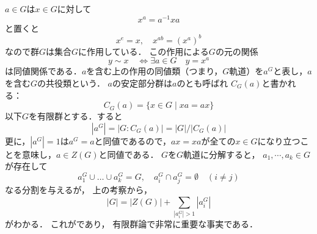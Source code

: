 $a\in G$は$x\in G$に対して
\[
     x^a = a^{-1}xa
\]
と置くと
\[
     x^e = x,\quad x^{ab}=(x^{a})^b
\]
なので群$G$は集合$G$に作用している．
この作用による$G$の元の関係
\[
     y \sim x \quad \Leftrightarrow \exists a\in G \quad y=x^a
\]
は同値関係である．$a$を含む上の作用の同値類（つまり，$G$軌道）を$a^G$と表し，$a$を含む$G$の共役類という．
$a$の安定部分群は$a$のとも呼ばれ
$C_G(a)$と書かれる：
\[
     C_G(a)=\{x\in G\mid xa=ax\}
\]
以下$G$を有限群とする．すると
\[
     |a^G| = |G:C_G(a)|=|G|/|C_G(a)|
\]
更に，$|a^G|=1$は$a^G=a$と同値であるので，$ax=xa$が全ての$x\in G$になり立つことを意味し，$a\in Z(G)$と同値である．
$G$を$G$軌道に分解すると，
$a_1, \cdots, a_k\in G$が存在して
\[
     a_1^G \cup \dots \cup a_k^G =G, \quad  
     a_i^G\cap a_j^G=\emptyset \quad( i\neq j)
\]
なる分割を与えるが，
上の考察から，
\[
     |G|=|Z(G) | + \sum_{|a_i^G|>1}|a_i^G|
\]
がわかる．
これがであり，
有限群論で非常に重要な事実である．

 



